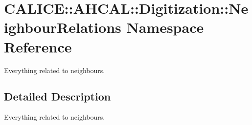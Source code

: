 \section{C\-A\-L\-I\-C\-E\-:\-:A\-H\-C\-A\-L\-:\-:Digitization\-:\-:Neighbour\-Relations Namespace Reference}
\label{namespaceCALICE_1_1AHCAL_1_1Digitization_1_1NeighbourRelations}


Everything related to neighbours.  




\subsection{Detailed Description}
Everything related to neighbours. 